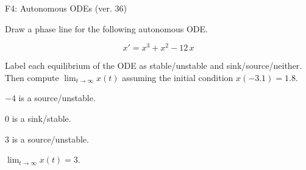 \begin{exercise}
  \begin{exerciseTitle}F4: Autonomous ODEs (ver. 36)\end{exerciseTitle}
  \begin{exerciseStatement}
    

      Draw a phase line for the following 
      autonomous ODE.
    

    
\[x'= x^{3} + x^{2} - 12 \, x\]

    

      Label each equilibrium of the ODE
      as stable/unstable and sink/source/neither.
      Then compute \(\lim_{t\to\infty}x(t)\)
      assuming the initial condition
      \(x( -3.1 )= 1.8\).
    

  \end{exerciseStatement}
  \begin{exerciseAnswer}
    

      \(-4\) is a source/unstable.
      
        \(0\) is a sink/stable.
      
      \(3\) is a source/unstable.
    

    

      \(\lim_{t\to\infty}x(t)=3\).
    

  \end{exerciseAnswer}
\end{exercise}